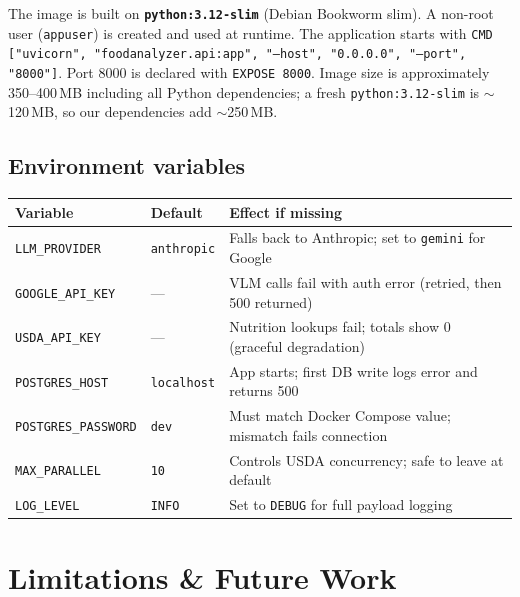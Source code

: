 \documentclass[11pt,a4paper]{article}
\begin{document}
The image is built on \textbf{\texttt{python:3.12-slim}} (Debian Bookworm slim).
A non-root user (\texttt{appuser}) is created and used at runtime.
The application starts with \texttt{CMD ["uvicorn", "foodanalyzer.api:app", "--host", "0.0.0.0", "--port", "8000"]}.
Port 8000 is declared with \texttt{EXPOSE 8000}.
Image size is approximately 350--400\,MB including all Python dependencies; a fresh \texttt{python:3.12-slim} is $\sim$120\,MB, so our dependencies add $\sim$250\,MB.

\subsection{Environment variables}

\begin{center}\small
\begin{tabularx}{\textwidth}{@{} l l X @{}}
\toprule
\textbf{Variable} & \textbf{Default} & \textbf{Effect if missing} \\
\midrule
\texttt{LLM\_PROVIDER}      & \texttt{anthropic}  & Falls back to Anthropic; set to \texttt{gemini} for Google \\
\texttt{GOOGLE\_API\_KEY}   & ---                 & VLM calls fail with auth error (retried, then 500 returned) \\
\texttt{USDA\_API\_KEY}     & ---                 & Nutrition lookups fail; totals show 0 (graceful degradation) \\
\texttt{POSTGRES\_HOST}     & \texttt{localhost}  & App starts; first DB write logs error and returns 500 \\
\texttt{POSTGRES\_PASSWORD} & \texttt{dev}        & Must match Docker Compose value; mismatch fails connection \\
\texttt{MAX\_PARALLEL}      & \texttt{10}         & Controls USDA concurrency; safe to leave at default \\
\texttt{LOG\_LEVEL}         & \texttt{INFO}       & Set to \texttt{DEBUG} for full payload logging \\
\bottomrule
\end{tabularx}
\end{center}

\section{Limitations \& Future Work}\label{sec:limits}
\end{document}
